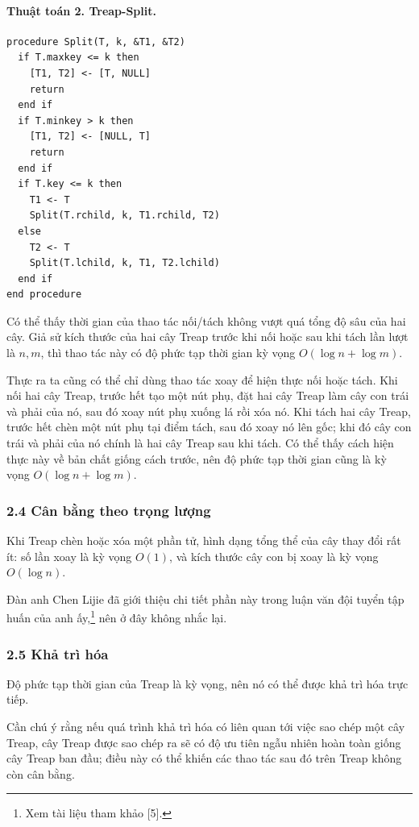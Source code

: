 \documentclass[11pt]{article}
\begin{document}
\paragraph{Thuật toán 2. Treap-Split.}
\begin{verbatim}
procedure Split(T, k, &T1, &T2)
  if T.maxkey <= k then
    [T1, T2] <- [T, NULL]
    return
  end if
  if T.minkey > k then
    [T1, T2] <- [NULL, T]
    return
  end if
  if T.key <= k then
    T1 <- T
    Split(T.rchild, k, T1.rchild, T2)
  else
    T2 <- T
    Split(T.lchild, k, T1, T2.lchild)
  end if
end procedure
\end{verbatim}

Có thể thấy thời gian của thao tác nối/tách không vượt quá tổng độ sâu của hai
cây. Giả sử kích thước của hai cây Treap trước khi nối hoặc sau khi tách lần
lượt là \(n,m\), thì thao tác này có độ phức tạp thời gian kỳ vọng
\(O(\log n+\log m)\).

Thực ra ta cũng có thể chỉ dùng thao tác xoay để hiện thực nối hoặc tách. Khi
nối hai cây Treap, trước hết tạo một nút phụ, đặt hai cây Treap làm cây con
trái và phải của nó, sau đó xoay nút phụ xuống lá rồi xóa nó. Khi tách hai cây
Treap, trước hết chèn một nút phụ tại điểm tách, sau đó xoay nó lên gốc; khi
đó cây con trái và phải của nó chính là hai cây Treap sau khi tách. Có thể thấy
cách hiện thực này về bản chất giống cách trước, nên độ phức tạp thời gian cũng
là kỳ vọng \(O(\log n+\log m)\).

\subsubsection*{2.4 Cân bằng theo trọng lượng}

Khi Treap chèn hoặc xóa một phần tử, hình dạng tổng thể của cây thay đổi rất
ít: số lần xoay là kỳ vọng \(O(1)\), và kích thước cây con bị xoay là kỳ vọng
\(O(\log n)\).

Đàn anh Chen Lijie đã giới thiệu chi tiết phần này trong luận văn đội tuyển tập
huấn của anh ấy,\footnote{Xem tài liệu tham khảo [5].} nên ở đây không nhắc lại.

\subsubsection*{2.5 Khả trì hóa}

Độ phức tạp thời gian của Treap là kỳ vọng, nên nó có thể được khả trì hóa trực
tiếp.

Cần chú ý rằng nếu quá trình khả trì hóa có liên quan tới việc sao chép một cây
Treap, cây Treap được sao chép ra sẽ có độ ưu tiên ngẫu nhiên hoàn toàn giống
cây Treap ban đầu; điều này có thể khiến các thao tác sau đó trên Treap không
còn cân bằng.
\end{document}
